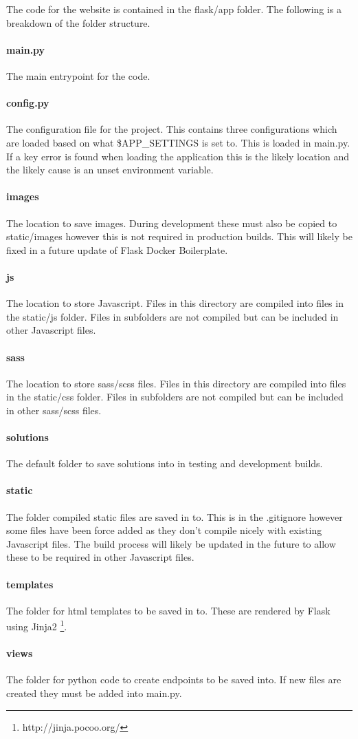 The code for the website is contained in the flask/app folder.  The following is a breakdown of the folder structure.

\paragraph{main.py}  The main entrypoint for the code.

\paragraph{config.py}  The configuration file for the project.  This contains three configurations which are loaded based on what \$APP\_SETTINGS is set to.  This is loaded in main.py.  If a key error is found when loading the application this is the likely location and the likely cause is an unset environment variable.

\paragraph{images}  The location to save images.  During development these must also be copied to static/images however this is not required in production builds.  This will likely be fixed in a future update of Flask Docker Boilerplate.

\paragraph{js}  The location to store Javascript.  Files in this directory are compiled into files in the static/js folder.  Files in subfolders are not compiled but can be included in other Javascript files.

\paragraph{sass}  The location to store sass/scss files.  Files in this directory are compiled into files in the static/css folder.  Files in subfolders are not compiled but can be included in other sass/scss files.

\paragraph{solutions}  The default folder to save solutions into in testing and development builds.

\paragraph{static}  The folder compiled static files are saved in to.  This is in the .gitignore however some files have been force added as they don't compile nicely with existing Javascript files.  The build process will likely be updated in the future to allow these to be required in other Javascript files.

\paragraph{templates}  The folder for html templates to be saved in to.  These are rendered by Flask using Jinja2 \footnote{http://jinja.pocoo.org/}.

\paragraph{views}  The folder for python code to create endpoints to be saved into.  If new files are created they must be added into main.py.
